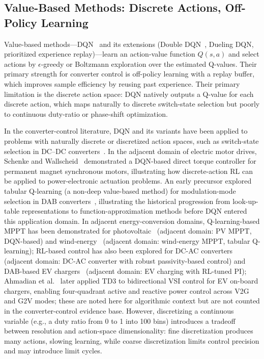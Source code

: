\documentclass[manuscript,screen,review]{acmart}
\begin{document}
\subsection{Value-Based Methods: Discrete Actions, Off-Policy Learning}

Value-based methods---DQN~\cite{mnih2015human} and its extensions (Double DQN~\cite{van2016deep}, Dueling DQN, prioritized experience replay)---learn an action-value function $Q(s,a)$ and select actions by $\epsilon$-greedy or Boltzmann exploration over the estimated Q-values.
Their primary strength for converter control is off-policy learning with a replay buffer, which improves sample efficiency by reusing past experience.
Their primary limitation is the discrete action space: DQN natively outputs a Q-value for each discrete action, which maps naturally to discrete switch-state selection but poorly to continuous duty-ratio or phase-shift optimization.

In the converter-control literature, DQN and its variants have been applied to problems with naturally discrete or discretized action spaces, such as switch-state selection in DC--DC converters~\cite{zandi2023voltage}.
In the adjacent domain of electric motor drives, Schenke and Wallscheid~\cite{schenke2021deep} demonstrated a DQN-based direct torque controller for permanent magnet synchronous motors, illustrating how discrete-action RL can be applied to power-electronic actuation problems.
An early precursor explored tabular Q-learning (a non-deep value-based method) for modulation-mode selection in DAB converters~\cite{tang2020reinforcement}, illustrating the historical progression from look-up-table representations to function-approximation methods before DQN entered this application domain.
In adjacent energy-conversion domains, Q-learning-based MPPT has been demonstrated for photovoltaic~\cite{chou2019maximum} (adjacent domain: PV MPPT, DQN-based) and wind-energy~\cite{wei2015reinforcement} (adjacent domain: wind-energy MPPT, tabular Q-learning); RL-based control has also been explored for DC-AC converters~\cite{nicola2022comparative} (adjacent domain: DC-AC converter with robust passivity-based control) and DAB-based EV chargers~\cite{mahazabeen2022performance} (adjacent domain: EV charging with RL-tuned PI); Ahmadian et al.~\cite{ahmadian2024empowering} later applied TD3 to bidirectional VSI control for EV on-board chargers, enabling four-quadrant active and reactive power control across V2G and G2V modes; these are noted here for algorithmic context but are not counted in the converter-control evidence base.
However, discretizing a continuous variable (e.g., a duty ratio from 0 to 1 into 100 bins) introduces a tradeoff between resolution and action-space dimensionality: fine discretization produces many actions, slowing learning, while coarse discretization limits control precision and may introduce limit cycles.
\end{document}
